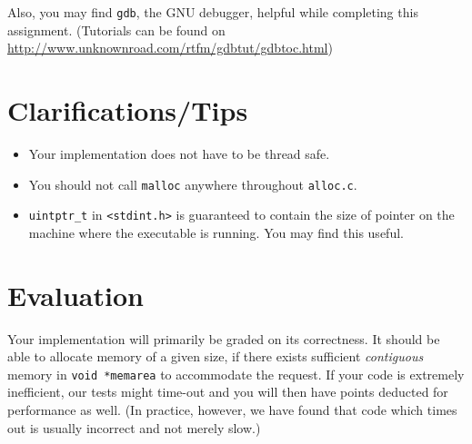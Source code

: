 \documentclass[12pt]{article}
\begin{document}
Also, you may find \texttt{gdb}, the GNU debugger, helpful while completing this assignment. (Tutorials can be found on \url{http://www.unknownroad.com/rtfm/gdbtut/gdbtoc.html})


\section{Clarifications/Tips}
\begin{itemize}
\item Your implementation does not have to be thread safe.
\item You should not call \texttt{malloc} anywhere throughout \texttt{alloc.c}. 
\item \texttt{uintptr\_t} in \texttt{<stdint.h>} is guaranteed to contain the size of pointer on the machine where the executable is running. You may find this useful.
\end{itemize}


\section{Evaluation}
Your implementation will primarily be graded on its correctness. It should be able to allocate memory of a given size, if there exists sufficient \textit{contiguous} memory in \texttt{void *memarea} to accommodate the request. If your code is extremely inefficient, our tests might time-out and you will then have points deducted for performance as well. (In practice, however, we have found that code which times out is usually incorrect and not merely slow.)
\end{document}

